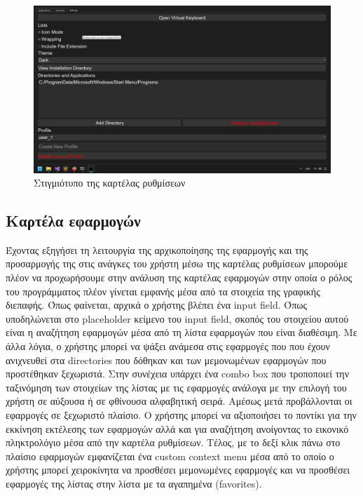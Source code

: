 \begin{figure}[H]
    \centering
    \includegraphics[width=1.0\textwidth]{./images/tab_settings.png}
	\caption{Στιγμιότυπο της καρτέλας ρυθμίσεων}
\end{figure}



\subsection{Καρτέλα εφαρμογών}

Έχοντας εξηγήσει τη λειτουργία της αρχικοποίησης της εφαρμογής και της προσαρμογής της στις
ανάγκες του χρήστη μέσω της καρτέλας ρυθμίσεων μπορούμε πλέον να προχωρήσουμε στην ανάλυση
της καρτέλας εφαρμογών στην οποία ο ρόλος του προγράμματος πλέον γίνεται εμφανής μέσα από τα
στοιχεία της γραφικής διεπαφής. 
Όπως φαίνεται, αρχικά ο χρήστης βλέπει ένα input field. Όπως υποδηλώνεται στο placeholder
κείμενο του input field, σκοπός του στοιχείου αυτού είναι η αναζήτηση εφαρμογών μέσα από τη
λίστα εφαρμογών που είναι διαθέσιμη. Με άλλα λόγια, ο χρήστης μπορεί να ψάξει 
ανάμεσα στις εφαρμογές που που έχουν ανιχνευθεί στα directories που δόθηκαν και των μεμονωμένων εφαρμογών
που προστέθηκαν ξεχωριστά. Στην συνέχεια υπάρχει ένα combo box που τροποποιεί την ταξινόμηση
των στοιχείων της λίστας με τις εφαρμογές ανάλογα με την επιλογή του χρήστη σε αύξουσα ή σε
φθίνουσα αλφαβητική σειρά. Αμέσως μετά προβάλλονται οι εφαρμογές σε ξεχωριστό πλαίσιο. Ο χρήστης μπορεί
να αξιοποιήσει το ποντίκι για την εκκίνηση εκτέλεσης των εφαρμογών αλλά και για αναζήτηση ανοίγοντας το εικονικό
πληκτρολόγιο μέσα από την καρτέλα ρυθμίσεων. Τέλος, με το δεξί κλικ πάνω στο πλαίσιο εφαρμογών
εμφανίζεται ένα custom context menu μέσα από το οποίο ο χρήστης μπορεί χειροκίνητα να προσθέσει
μεμονωμένες εφαρμογές και να προσθέσει εφαρμογές της λίστας στην λίστα με τα αγαπημένα (favorites).


